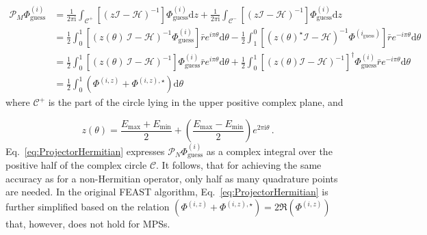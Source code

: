 \documentclass[journal=jctcce]{achemso}
\newcommand{\opr}[1]{\mathcal{#1}}
\begin{document}
\begin{equation}
  \begin{aligned}
    \mathcal{P}_{M} \Phi^{(i)}_{\text{guess}} &= 
    \frac{1}{2\pi \mathrm{i}} \int_{\mathcal{C}^+} \left[ (z \opr{I} - \opr{H})^{-1} \right] \Phi^{(i)}_{\text{guess}}  \text{d} z 
                            + \frac{1}{2\pi \mathrm{i}}\int_{\mathcal{C}^-} \left[ (z \opr{I} - \opr{H})^{-1} \right] \Phi^{(i)}_{\text{guess}}  \text{d} z \\
    &= \frac{1}{2} \int_0^1 \left[ (z(\theta) \, \opr{I} - \opr{H})^{-1}\Phi^{(i)}_{\text{guess}} \right] \bar{r} e^{i\pi\theta} \text{d} \theta 
   - \frac{1}{2} \int_1^0 \left[ (z(\theta)^\star \opr{I} - \opr{H})^{-1}\Phi^{(i_{\text{guess}})} \right] \bar{r} e^{-i\pi\theta} \text{d} \theta \\
    &= \frac{1}{2} \int_0^1 \left[ (z(\theta) \, \opr{I} - \opr{H})^{-1} \right] \Phi^{(i)}_{\text{guess}} \bar{r} e^{i\pi\theta} \text{d} \theta 
   + \frac{1}{2} \int_0^1 \left[ (z(\theta) \opr{I} - \opr{H})^{-1} \right]^\dagger \Phi^{(i)}_{\text{guess}} \bar{r} e^{-i\pi\theta} \text{d} \theta \\
    &= \frac{1}{2} \int_0^1 \left( \Phi^{(i,z)} + \Phi^{(i,z),\star} \right) \text{d} \theta 
  \end{aligned}
  \label{eq:ProjectorHermitian}
\end{equation}
%
where $\mathcal{C}^+$ is the part of the circle lying in the upper positive complex plane, and

\begin{equation}
  z(\theta) = \frac{E_\text{max}+E_\text{min}}{2} + \left( \frac{E_\text{max}-E_\text{min}}{2} \right) e^{2\pi\text{i}\theta} \, .
  \label{eq:ZetaDef}
\end{equation}
%
\noindent Eq.~\eqref{eq:ProjectorHermitian} expresses $\mathcal{P}_{N} \Phi^{(i)}_{\text{guess}}$ as a complex integral over the positive half of the complex circle $\mathcal{C}$.
It follows, that for achieving the same accuracy as for a non-Hermitian operator, only half as many quadrature points are needed.
In the original FEAST algorithm,\cite{Polizzi2009_FEAST} Eq.~\ref{eq:ProjectorHermitian} is further simplified based on the relation $\left( \Phi^{(i, z)} + \Phi^{(i,z),\star} \right) = 2 \Re(\Phi^{(i,z)})$ that, however, does not hold for MPSs.
\end{document}
